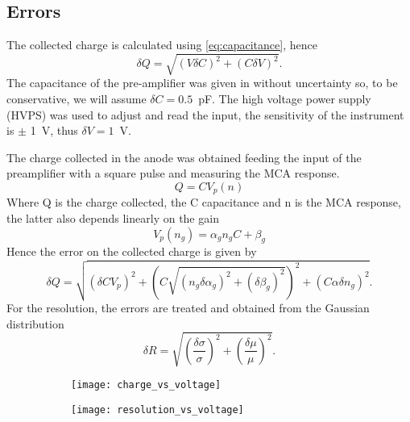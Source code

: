 \subsection{Errors}
\label{sec:errors}
The collected charge is calculated using \ref{eq:capacitance}, hence
\begin{equation}
  \label{eq:uncertainties}
  \delta Q = \sqrt{(V \delta C)^2 + (C \delta V)^2}.
\end{equation}
The capacitance of the pre-amplifier was given in \autocite{LabInstruction}
without uncertainty so, to be conservative, we will assume $\delta C =
0.5$~pF. The high voltage power supply (HVPS) was used to adjust and read the
input, the sensitivity of the instrument is $\pm$ 1~V, thus $\delta V = 1$~V.

The charge collected in the anode was obtained feeding the input of the
preamplifier with a square pulse and measuring the MCA response.
\begin{equation}
  Q = C V_{p}(n)
\end{equation}
Where Q is the charge collected, the C capacitance and n is the MCA response,
the latter also depends linearly on the gain
\begin{equation}
  V_{p}(n_g) = \alpha_g n_g C + \beta_g
\end{equation}
Hence the error on the collected charge is given by
\begin{equation}
  \delta Q = \sqrt{(\delta C V_p )^2 + \left( C \sqrt{( n_g \delta \alpha_g)^2 +
        (\delta \beta_g)^2} \right)^2 + (C \alpha \delta n_g)^2}.
\end{equation}
For the resolution, the errors are treated and obtained from the Gaussian
distribution
\begin{equation}
  \delta R = \sqrt{\left( \frac{\delta \sigma}{\sigma} \right)^2 + \left(
      \frac{\delta \mu}{\mu} \right)^2}.
\end{equation}
\begin{figure}[!h]
  \centering
  \begin{subfigure}[t]{.48\linewidth}
    \texttt{[image: charge\_vs\_voltage]}
    \caption{}
    \label{fig:charge_vs_voltage}
  \end{subfigure}
  \begin{subfigure}[t]{.48\linewidth}
    \texttt{[image: resolution\_vs\_voltage]}
    \caption{}
    \label{fig:resolution_vs_voltage}
  \end{subfigure}
  \caption{}
  \label{fig:results}
\end{figure}
